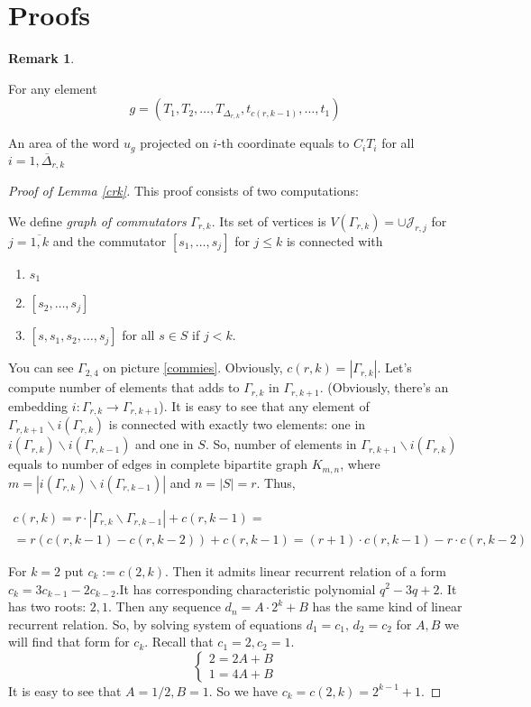 \documentclass[11pt]{amsart}
\theoremstyle{plain}
\theoremstyle{definition}
\newtheorem{Remark}[Theorem]{Remark}
\numberwithin{equation}{section}
\begin{document}
\section{Proofs}



\begin{Remark}\label{area of ug}


For any element 
$$g = (T_1,T_2,\ldots, T_{\Delta_{r,k}},t_{c(r,k-1)},\ldots, t_1)$$

An area of the word $u_g$ projected on $i$-th coordinate equals to $C_iT_i$ for all $i = \overline{1,\Delta_{r,k}}$
\end{Remark}


\begin{proof}[Proof of Lemma \ref{crk}]
This proof consists of two computations:

   
    
    We define {\it graph of commutators} $\Gamma_{r,k}$. Its set of vertices is $V(\Gamma_{r,k}) = \cup \mathcal{J}_{r,j}$ for $j = \overline{1,k}$ and the commutator $[s_1,\ldots,s_j]$ for $j\leq k$ is connected with 
    \begin{enumerate}
        \item $s_1$
        \item $[s_2,\ldots,s_j]$
        \item $[s,s_1,s_2,\ldots,s_j]$ for all $s\in S$ if $j < k$.
    \end{enumerate}
    You can see $\Gamma_{2,4}$ on picture \ref{commies}. Obviously, $c(r,k) = |\Gamma_{r,k}|$. Let's compute number of elements that adds to $\Gamma_{r,k}$ in $\Gamma_{r,k+1}$. (Obviously, there's an embedding $i:\Gamma_{r,k}\rightarrow\Gamma_{r,k+1}$). It is easy to see that any element of $\Gamma_{r,k+1}\backslash i(\Gamma_{r,k})$ is connected with exactly two elements: one in $i(\Gamma_{r,k})\backslash i(\Gamma_{r,k-1})$ and one in $S$. So, number of elements in $\Gamma_{r,k+1}\backslash i(\Gamma_{r,k})$ equals to number of edges in complete bipartite graph $K_{m,n}$, where $m = |i(\Gamma_{r,k})\backslash i(\Gamma_{r,k-1})|$ and $n = |S| = r$. Thus,
    
 \begin{multline*}
       c(r,k) = r\cdot|\Gamma_{r,k}\backslash \Gamma_{r,k-1}| + c(r,k-1) =\\= r(c(r,k-1) - c(r,k-2)) + c(r,k-1) =(r+1)\cdot c(r,k-1) - r\cdot c(r,k-2)
 \end{multline*}  
 
 For $k=2$ put $c_k:=c(2,k)$. Then it admits linear recurrent relation of a form $c_k = 3c_{k-1}-2c_{k-2}$.It has corresponding characteristic polynomial $q^2-3q+2$. It has two roots: $2,1$. Then any sequence $d_n = A\cdot 2^k+B$ has the same kind of linear recurrent relation. So, by solving system of equations $d_1 = c_1,\, d_2 = c_2$ for $A,B$ we will find that form for $c_k$. Recall that $c_1 = 2, c_2 = 1$.
 $$\begin{cases}
 2 = 2A+B\\
 1=4A+B
 \end{cases}$$
 It is easy to see that $A = 1/2, B = 1$. So we have $c_k = c(2,k) = 2^{k-1}+1$.
 

\end{proof}
\end{document}
